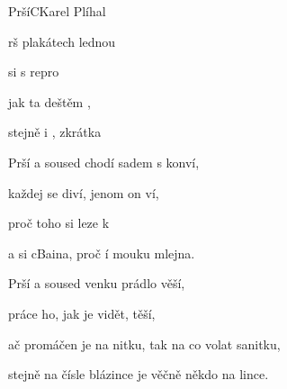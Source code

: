 \begin{song}{Prší}{C}{Karel Plíhal}

\begin{SBChorus}

rš   plakátech lednou

 si  s repro

jak ta  deštěm ,

stejně  i , zkrátka

\end{SBChorus}

\begin{SBVerse}

Prší a soused chodí sadem s konví,

každej se diví, jenom on ví,

proč  toho  si leze k 

a  si cBaina, proč í mouku  mlejna.

\end{SBVerse}

\begin{SBChorus}

\end{SBChorus}

\begin{SBVerse}

Prší a soused venku prádlo věší,

práce ho, jak je vidět, těší,

ač promáčen je na nitku, tak na co volat sanitku,

stejně na čísle blázince je věčně někdo na lince.

\end{SBVerse}

\end{song}

\clearpage
